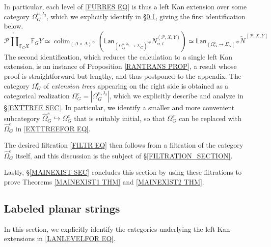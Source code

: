 \documentclass[a4paper,10pt
,draft
]{article}%
\numberwithin{equation}{section}
\numberwithin{figure}{section}
\theoremstyle{definition} %
\DeclareMathOperator{\colim}{colim}%
\newcommand{\1}{\ensuremath{\mathbbm 1}}%
\begin{document}
In particular, each level of 
\eqref{FURRES EQ}
is thus a left Kan extension over some category
$\Omega_G^{n,\lambda_l}$, which we explicitly identify in 
\S \ref{LABELSTRI SEC}, giving the first identification below.
\begin{equation}\label{EXTTREEFOR EQ}
	\mathcal{P} \mathbin{\check{\coprod}}_{\mathbb{F}_G X} \mathbb{F}_G Y 
\simeq 
	\colim_{(\Delta \times \Delta)^{op}}
	\left(
	\mathsf{Lan}_{\left( \Omega_{G}^{n,\lambda_l} \to \Sigma_G \right)^{op}}
	N_{n,l}^{(\mathcal{P},X,Y)}
	\right)
\simeq 
	\mathsf{Lan}_{\left( \Omega_{G}^{e} \to \Sigma_G \right)^{op}}
	\tilde{N}^{(\mathcal{P},X,Y)}
\end{equation}
The second identification, 
which reduces the calculation to a single left Kan extension, is an instance of 
Proposition \ref{RANTRANS PROP}, 
a result whose proof is straightforward but lengthy, 
and thus postponed to the appendix.
The category $\Omega_G^e$ of \textit{extension trees}
appearing on the right side
is obtained as a categorical realization
$\Omega_G^e = |\Omega_{G}^{n,\lambda_l}|$,
which we explicitly describe and analyze in 
\S \ref{EXTTREE SEC}.
In particular, we identify a smaller and more convenient
subcategory 
$\widehat{\Omega}_G^e \hookrightarrow \Omega_G^e$
that is suitably initial,
so that $\Omega_G^e$ can be replaced with $\widehat{\Omega}_G^e$
in \eqref{EXTTREEFOR EQ}.

The desired filtration \eqref{FILTR EQ}
then follows from a filtration of the 
category $\widehat{\Omega}_G^e$ itself,
and this discussion is the subject of
\S \ref{FILTRATION_SECTION}.

Lastly, \S \ref{MAINEXIST SEC} concludes this section
by using these filtrations to prove 
Theorems \ref{MAINEXIST1 THM} and \ref{MAINEXIST2 THM}.



\subsection{Labeled planar strings}\label{LABELSTRI SEC}


In this section, we explicitly identify the categories underlying the left Kan extensions in \eqref{LANLEVELFOR EQ}.
\end{document}
